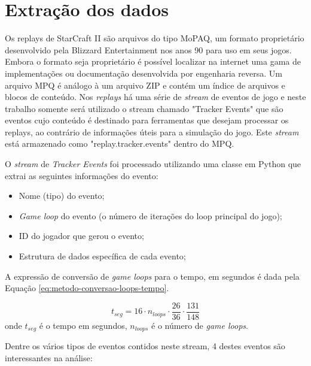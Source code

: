 		\section{Extração dos dados}

Os replays de StarCraft II são arquivos do tipo MoPAQ, um formato proprietário desenvolvido pela Blizzard Entertainment nos anos 90 para uso em seus jogos. Embora o formato seja proprietário é possível localizar na internet uma gama de implementações ou documentação desenvolvida por engenharia reversa. Um arquivo MPQ é análogo à um arquivo ZIP e contém um índice de arquivos e blocos de conteúdo. Nos \textit{replays} há uma série de \textit{stream} de eventos de jogo e neste trabalho somente será utilizado o stream chamado "Tracker Events" que são eventos cujo conteúdo é destinado para ferramentas que desejam processar os replays, ao contrário de informações úteis para a simulação do jogo. Este \textit{stream} está armazenado como "replay.tracker.events" dentro do MPQ.

O \textit{stream} de \textit{Tracker Events} foi processado utilizando uma classe em Python que extrai as seguintes informações do evento:

\begin{itemize}
	\item Nome (tipo) do evento;
	\item \textit{Game loop} do evento (o número de iterações do loop principal do jogo);
	\item ID do jogador que gerou o evento;
	\item Estrutura de dados específica de cada evento;
\end{itemize}

A expressão de conversão de \textit{game loops} para o tempo, em segundos é dada pela Equação \ref{eq:metodo-conversao-loops-tempo}.

\begin{equation}
	t_{seg} = 16 \cdot n_{loops} \cdot \frac{26}{36} \cdot \frac{131}{148}
	\label{eq:metodo-conversao-loops-tempo}
\end{equation}
\noindent onde $t_{seg}$ é o tempo em segundos, $n_{loops}$ é o número de \textit{game loops}.

Dentre os vários tipos de eventos contidos neste stream, 4 destes eventos são interessantes na análise:

